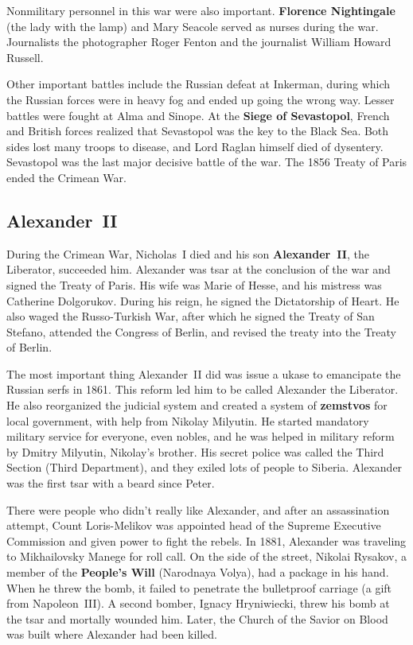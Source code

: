 Nonmilitary personnel in this war were also important.
\textbf{Florence Nightingale} (the lady with the lamp) and Mary Seacole served as nurses during the war.
Journalists the photographer Roger Fenton and the journalist William Howard Russell.

Other important battles include the Russian defeat at Inkerman,
during which the Russian forces were in heavy fog and ended up going the wrong way.
Lesser battles were fought at Alma and Sinope.
At the \textbf{Siege of Sevastopol}, French and British forces realized that Sevastopol was the key to the Black Sea.
Both sides lost many troops to disease, and Lord Raglan himself died of dysentery.
Sevastopol was the last major decisive battle of the war.
The 1856 Treaty of Paris ended the Crimean War.

\subsection*{Alexander~II}

During the Crimean War, Nicholas~I died and his son \textbf{Alexander~II}, the Liberator, succeeded him.
Alexander was tsar at the conclusion of the war and signed the Treaty of Paris.
His wife was Marie of Hesse, and his mistress was Catherine Dolgorukov.
During his reign, he signed the Dictatorship of Heart.
He also waged the Russo-Turkish War, after which he signed the Treaty of San Stefano,
attended the Congress of Berlin, and revised the treaty into the Treaty of Berlin.

The most important thing Alexander~II did was issue a ukase to emancipate the Russian serfs in 1861.
This reform led him to be called Alexander the Liberator.
He also reorganized the judicial system and created a system of \textbf{zemstvos} for local government,
with help from Nikolay Milyutin.
He started mandatory military service for everyone, even nobles,
and he was helped in military reform by Dmitry Milyutin, Nikolay's brother.
His secret police was called the Third Section (Third Department), and they exiled lots of people to Siberia.
Alexander was the first tsar with a beard since Peter.

There were people who didn't really like Alexander, and after an assassination attempt,
Count Loris-Melikov was appointed head of the Supreme Executive Commission and given power to fight the rebels.
In 1881, Alexander was traveling to Mikhailovsky Manege for roll call.
On the side of the street, Nikolai Rysakov, a member of the \textbf{People's Will} (Narodnaya Volya),
had a package in his hand.
When he threw the bomb, it failed to penetrate the bulletproof carriage (a gift from Napoleon~III).
A second bomber, Ignacy Hryniwiecki, threw his bomb at the tsar and mortally wounded him.
Later, the Church of the Savior on Blood was built where Alexander had been killed.


